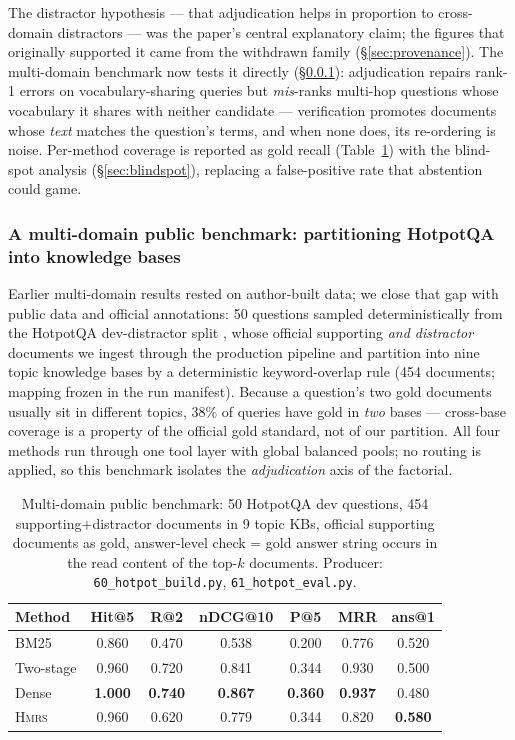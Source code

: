 \documentclass[sigconf, review, anonymous]{acmart}
\newcommand{\sys}{\textsc{Hmrs}}
\begin{document}
The distractor hypothesis --- that adjudication helps in proportion to
cross-domain distractors --- was the paper's central explanatory claim; the
figures that originally supported it came from the withdrawn family
(\S\ref{sec:provenance}). The multi-domain benchmark now tests it directly
(\S\ref{sec:multidomain}): adjudication repairs rank-1 errors on
vocabulary-sharing queries but \emph{mis}-ranks multi-hop questions whose
vocabulary it shares with neither candidate --- verification promotes
documents whose \emph{text} matches the question's terms, and when none does,
its re-ordering is noise. Per-method coverage is reported as gold recall
(Table~\ref{tab:hotpot}) with the blind-spot analysis (\S\ref{sec:blindspot}),
replacing a false-positive rate that abstention could game.

\subsubsection{A multi-domain public benchmark: partitioning HotpotQA into
knowledge bases}\label{sec:multidomain}
Earlier multi-domain results rested on author-built data; we close that gap
with public data and official annotations: 50
questions sampled deterministically from the HotpotQA dev-distractor split
\cite{yang2018hotpotqa}, whose official supporting \emph{and distractor}
documents we ingest through the production pipeline and partition into nine
topic knowledge bases by a deterministic keyword-overlap rule (454 documents;
mapping frozen in the run manifest). Because a question's two gold documents
usually sit in different topics, $38\%$ of queries have gold in \emph{two}
bases --- cross-base coverage is a property of the official gold standard, not
of our partition. All four methods run through one tool layer with global
balanced pools; no routing is applied, so this benchmark isolates the
\emph{adjudication} axis of the factorial.

\begin{table}[t]
\centering\small
\caption{Multi-domain public benchmark: 50 HotpotQA dev questions, 454
supporting+distractor documents in 9 topic KBs, official supporting documents
as gold, answer-level check = gold answer string occurs in the read content of
the top-$k$ documents. Producer: \texttt{60\_hotpot\_build.py},
\texttt{61\_hotpot\_eval.py}.}
\label{tab:hotpot}
\begin{tabular}{@{}lcccccc@{}}
\toprule
Method & Hit@5 & R@2 & nDCG@10 & P@5 & MRR & ans@1 \\
\midrule
BM25       & 0.860 & 0.470 & 0.538 & 0.200 & 0.776 & 0.520 \\
Two-stage  & 0.960 & 0.720 & 0.841 & 0.344 & 0.930 & 0.500 \\
Dense      & \textbf{1.000} & \textbf{0.740} & \textbf{0.867} & \textbf{0.360} & \textbf{0.937} & 0.480 \\
\sys{}     & 0.960 & 0.620 & 0.779 & 0.344 & 0.820 & \textbf{0.580} \\
\bottomrule
\end{tabular}
\end{table}
\end{document}
